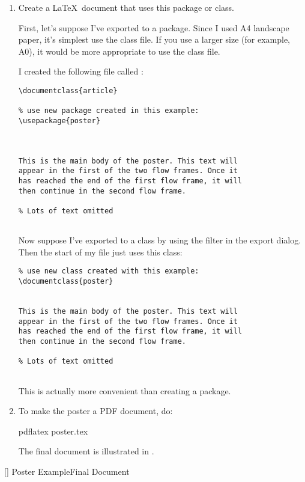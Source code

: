 \begin{enumerate}
[]
{}
{Poster Example\dash Export Frame Information to a \LaTeX{} Package}

\item Create a \LaTeX\ document that uses this package or class.

First, let's suppose I've exported to a package. Since I
used A4 landscape paper, it's simplest use the 
class file. If you use a larger size (for example, A0), it would be more
appropriate to use the  class file.

I created the following file called :
\begin{verbatim}
\documentclass{article}

% use new package created in this example:
\usepackage{poster}



This is the main body of the poster. This text will
appear in the first of the two flow frames. Once it
has reached the end of the first flow frame, it will 
then continue in the second flow frame.

% Lots of text omitted


\end{verbatim}

Now suppose I've exported to a class by using the
 filter in the export dialog. Then the start of my
 file just uses this class:
\begin{verbatim}
% use new class created with this example:
\documentclass{poster}


This is the main body of the poster. This text will
appear in the first of the two flow frames. Once it
has reached the end of the first flow frame, it will 
then continue in the second flow frame.

% Lots of text omitted


\end{verbatim}
This is actually more convenient than creating a package.

\item To make the poster a PDF document, do:
\begin{terminal}
pdflatex poster.tex
\end{terminal}%
The final document is illustrated in .
\end{enumerate}

[]
{}
{Poster Example\dash Final Document}

